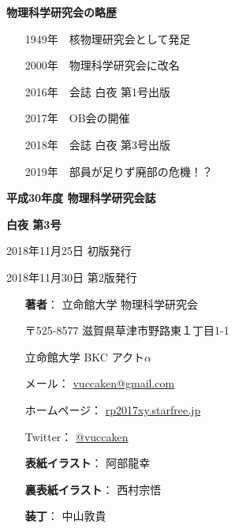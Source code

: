 \documentclass[11pt,b5paper,papersize,dvipdfmx]{jsbook}
\begin{document}

\clearpage
\thispagestyle{empty}

{\bf 物理科学研究会の略歴}
\begin{itemize}
  \item[] 1949年　核物理研究会として発足
  \item[] 2000年　物理科学研究会に改名
  \item[] 2016年　会誌 白夜 第1号出版
  \item[] 2017年　OB会の開催
  \item[] 2018年　会誌 白夜 第3号出版
  \item[] 2019年　部員が足りず廃部の危機！？
\end{itemize}



\vspace{15zw}

{\bf 平成30年度 物理科学研究会誌}\par
{\large \bf 白夜 第3号}\vspace{-1zw}\\
\hrulefill \par
2018年11月25日 \quad 初版発行\par
2018年11月30日 \quad 第2版発行

\vspace{1.5zw}

\begin{minipage}{0.15\hsize}
    \hspace{1zw}
\end{minipage}
\begin{minipage}{0.7\hsize}
  \begin{itemize}
    \item[{\bf 著者}：] 立命館大学 物理科学研究会
    \item[ ] 〒525-8577 滋賀県草津市野路東１丁目1-1
    \item[ ] 立命館大学 BKC アクト$\alpha$
    \item[ ] メール： \url{vuccaken@gmail.com}
    \item[ ] ホームページ： \url{rp2017xy.starfree.jp}
    \item[ ] Twitter： \url{@vuccaken}
    \item[{\bf 表紙イラスト}：] 阿部龍幸
    \item[{\bf 裏表紙イラスト}：] 西村宗悟
    \item[{\bf 装丁}：] 中山敦貴 
  \end{itemize}
\end{minipage}
\end{document}
